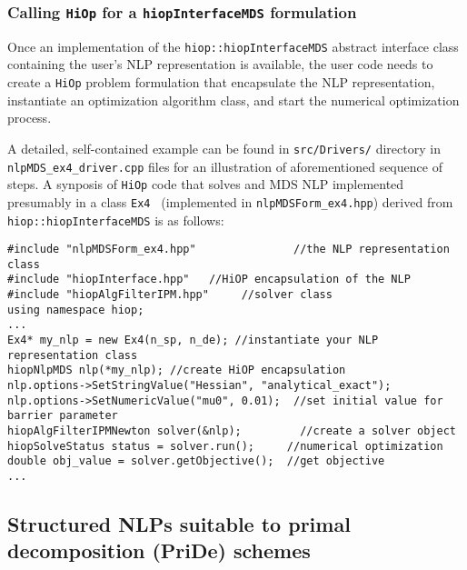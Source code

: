 \documentclass[11pt]{article}
\newcommand{\Hi}{\texttt{HiOp}\xspace}
\begin{document}
\subsubsection{Calling \Hi for a \texttt{hiopInterfaceMDS} formulation}
Once an implementation of the \texttt{hiop::hiopInterfaceMDS} abstract interface class containing the user's NLP representation is available, the  user code needs to create a \Hi problem formulation that encapsulate the NLP representation, instantiate an optimization algorithm class, and start the numerical optimization process. 

A detailed, self-contained example can be found in \texttt{src/Drivers/} directory in \texttt{nlpMDS\_ex4\_driver.cpp} files for an illustration of aforementioned sequence of steps. A synposis of \Hi code that solves and MDS NLP implemented presumably in a class \texttt{Ex4 } (implemented in \texttt{nlpMDSForm\_ex4.hpp}) derived from \texttt{hiop::hiopInterfaceMDS} is as follows:
\begin{lstlisting}
#include "nlpMDSForm_ex4.hpp"               //the NLP representation class
#include "hiopInterface.hpp"   //HiOP encapsulation of the NLP
#include "hiopAlgFilterIPM.hpp"     //solver class
using namespace hiop;
...
Ex4* my_nlp = new Ex4(n_sp, n_de); //instantiate your NLP representation class                    
hiopNlpMDS nlp(*my_nlp); //create HiOP encapsulation
nlp.options->SetStringValue("Hessian", "analytical_exact");
nlp.options->SetNumericValue("mu0", 0.01);  //set initial value for  barrier parameter
hiopAlgFilterIPMNewton solver(&nlp);         //create a solver object
hiopSolveStatus status = solver.run();     //numerical optimization
double obj_value = solver.getObjective();  //get objective
...
\end{lstlisting}


\subsection{Structured NLPs suitable to primal decomposition (PriDe) schemes}\label{sec:pride}
\end{document}
